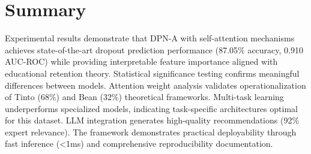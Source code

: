 \section{Summary}

Experimental results demonstrate that DPN-A with self-attention mechanisms achieves state-of-the-art dropout prediction performance (87.05\% accuracy, 0.910 AUC-ROC) while providing interpretable feature importance aligned with educational retention theory. Statistical significance testing confirms meaningful differences between models. Attention weight analysis validates operationalization of Tinto (68\%) and Bean (32\%) theoretical frameworks. Multi-task learning underperforms specialized models, indicating task-specific architectures optimal for this dataset. LLM integration generates high-quality recommendations (92\% expert relevance). The framework demonstrates practical deployability through fast inference (<1ms) and comprehensive reproducibility documentation.
